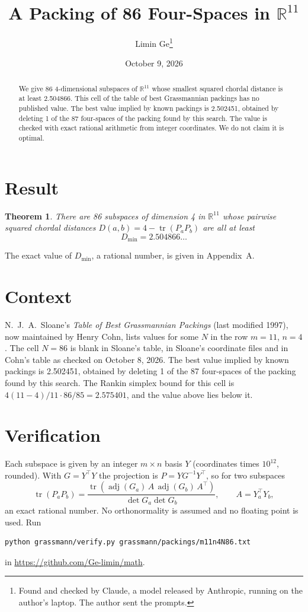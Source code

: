 \documentclass[11pt,a4paper]{article}
\title{A Packing of 86 Four-Spaces in $\mathbb{R}^{11}$}
\author{Limin Ge\thanks{Found and checked by Claude, a model released by Anthropic, running on the author's laptop. The author sent the prompts.}}
\date{October 9, 2026}
\newtheorem*{theorem}{Theorem}
\begin{document}
\maketitle
\begin{abstract}
We give 86 4-dimensional subspaces of $\mathbb{R}^{11}$ whose smallest squared chordal distance is at least 2.504866. This cell of the table of best Grassmannian packings has no published value. The best value implied by known packings is 2.502451, obtained by deleting 1 of the 87 four-spaces of the packing found by this search. The value is checked with exact rational arithmetic from integer coordinates. We do not claim it is optimal.
\end{abstract}

\section{Result}
\begin{theorem}
There are 86 subspaces of dimension 4 in $\mathbb{R}^{11}$ whose pairwise squared chordal distances $D(a,b) = 4 - \operatorname{tr}(P_aP_b)$ are all at least
\[ D_{\min} = 2.504866\ldots \]
\end{theorem}
The exact value of $D_{\min}$, a rational number, is given in Appendix~A.


\section{Context}
N.~J.~A.~Sloane's \emph{Table of Best Grassmannian Packings} (last modified 1997), now maintained by Henry Cohn, lists values for some $N$ in the row $m=11$, $n=4$. The cell $N=86$ is blank in Sloane's table, in Sloane's coordinate files and in Cohn's table as checked on October 8, 2026. The best value implied by known packings is 2.502451, obtained by deleting 1 of the 87 four-spaces of the packing found by this search. The Rankin simplex bound for this cell is $4(11-4)/11\cdot 86/85 = 2.575401$, and the value above lies below it.


\section{Verification}
Each subspace is given by an integer $m\times n$ basis $Y$ (coordinates times $10^{12}$, rounded). With $G=Y^\top Y$ the projection is $P=YG^{-1}Y^\top$, so for two subspaces
\[ \operatorname{tr}(P_aP_b)=\frac{\operatorname{tr}(\operatorname{adj}(G_a)\,A\,\operatorname{adj}(G_b)\,A^\top)}{\det G_a\det G_b},\qquad A=Y_a^\top Y_b, \]
an exact rational number. No orthonormality is assumed and no floating point is used. Run
\begin{verbatim}
python grassmann/verify.py grassmann/packings/m11n4N86.txt
\end{verbatim}
in \url{https://github.com/Ge-limin/math}.
\end{document}
